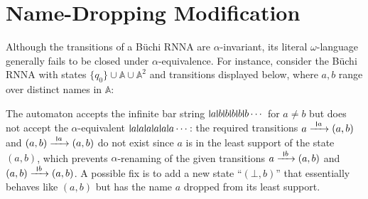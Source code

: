 \documentclass[final,a4paper,UKenglish,thm-restate,autoref,numberwithinsect]{lipics-v2021}
\newcommand{\midmid}{\hspace{0.2ex}{\rule[-0.1ex]{0.6pt}{1.65ex}}\hspace{0.2ex}}
\newcommand{\scriptmidmid}{\hspace{0.2ex}{\rule[-0.1ex]{0.6pt}{1.1ex}}\hspace{0.2ex}}
\newcommand{\newletter}[1]{{\midmid}#1}
\newcommand{\scriptnew}[1]{{\scriptmidmid}#1}
\numberwithin{equation}{section}
\newcommand{\xto}[1]{\xrightarrow{~#1~}}
\newcommand{\+}[1]{\mathcal{#1}\xspace}
\newcommand{\names}{\mathbb{A}}
\theoremstyle{definition}
\begin{document}
\section{Name-Dropping Modification}\label{sec:name-dropping}
%
Although the transitions of a Büchi RNNA are $\alpha$-invariant, its
literal $\omega$-language generally fails to be closed under
$\alpha$-equivalence. For instance, consider the Büchi RNNA with
states $\{q_0\}\cup \names \cup \names^2$ and transitions displayed
below, where $a,b$ range over distinct names in $\names$:
\begin{center}
\end{center}
The automaton accepts the infinite bar string
$\newletter a\newletter b\newletter b\newletter b\newletter
b\newletter b\cdots $ for $a\neq b$ but does not accept the
$\alpha$-equivalent
$\newletter a \newletter a \newletter a \newletter a \newletter a
\newletter a\cdots$: the required transitions $a\xto{\scriptnew a} (a,b)$ and
$(a,b)\xto{\scriptnew a} (a,b)$ do not exist since $a$ is in the least support of the state $(a,b)$, which prevents $\alpha$-renaming of the given transitions $a\xto{\scriptnew b} (a,b)$ and $(a,b)\xto{\scriptnew b}(a,b)$.
A possible fix is to add a new
state ``$(\bot, b)$'' that essentially behaves like $(a,b)$ but has the name
$a$ dropped from its least support.
\end{document}
